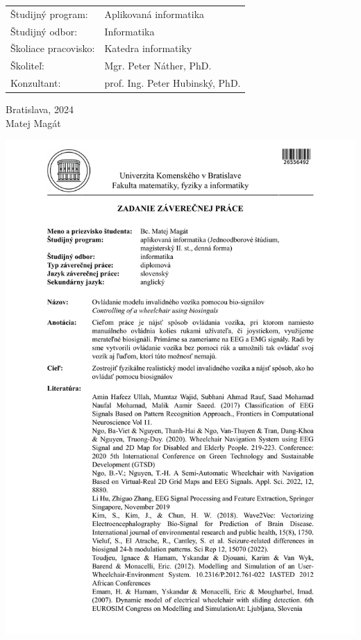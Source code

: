 \documentclass[12pt, twoside]{book}
\def\mfrok{2024}
\def\mfautor{Matej Magát}
\def\mfskolitel{Mgr. Peter Náther, PhD.}
\def\mfkonzultant{prof. Ing. Peter Hubinský, PhD. }
\def\mfmiesto{Bratislava, \mfrok}
\def\mfodbor{ Informatika}
\def\program{ Aplikovaná informatika }
\def\mfpracovisko{ Katedra informatiky }
\begin{document}
\vfill

\noindent
\begin{tabular}{ll}
Študijný program: & \program \\
Študijný odbor: & \mfodbor \\
Školiace pracovisko: & \mfpracovisko \\
Školiteľ: & \mfskolitel \\
Konzultant: & \mfkonzultant \\
\end{tabular}

\vfill


\noindent \mfmiesto\\
\mfautor

\cleardoublepage



\newpage 
\thispagestyle{empty}
\hspace{-2cm}\includegraphics[width=1.0\textwidth]{images/zadanieDP}
\end{document}
